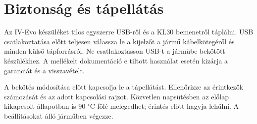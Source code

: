 \chapter{Biztonság és tápellátás}
Az IV-Evo készüléket tilos egyszerre USB-ről és a KL30 bemenetről táplálni. USB csatlakoztatása előtt teljesen válassza le a kijelzőt a jármű kábelkötegéről és minden külső tápforrásról. Ne csatlakoztasson USB-t a járműbe bekötött készülékhez. A mellékelt dokumentáció e tiltott használat esetén kizárja a garanciát és a visszavételt.

A bekötés módosítása előtt kapcsolja le a tápellátást. Ellenőrizze az érintkezők számozását és az adott kapcsolási rajzot. Közvetlen napsütésben az előlap kikapcsolt állapotban is 90 $^\circ$C fölé melegedhet; érintés előtt hagyja lehűlni. A beállításokat álló járműben végezze.
